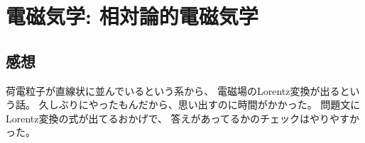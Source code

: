 \documentclass[../../sp_2014.tex]{subfiles}
\begin{document}
\section{電磁気学: 相対論的電磁気学}


\subsection*{感想}
荷電粒子が直線状に並んでいるという系から、
電磁場のLorentz変換が出るという話。
久しぶりにやったもんだから、思い出すのに時間がかかった。
問題文にLorentz変換の式が出てるおかげで、
答えがあってるかのチェックはやりやすかった。
\end{document}
